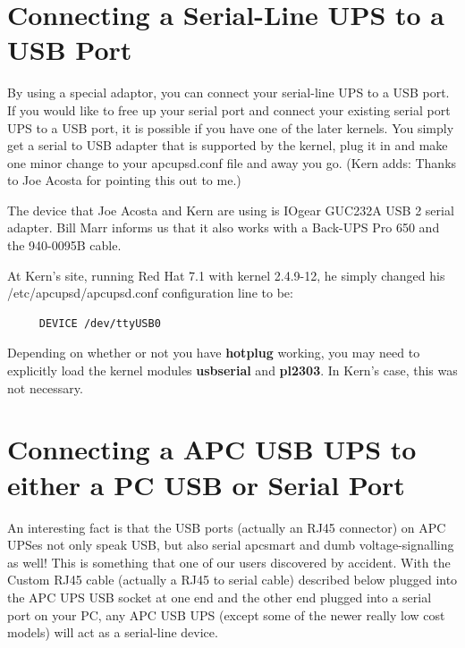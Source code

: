 {{{{{{{{{\label{Connecting-a-Serial_002dLine-UPS-to-a-USB-Port}

\section*{Connecting a Serial-Line UPS to a USB Port}

\label{index-Serial-on-USB-190}
By using a special adaptor, you can connect your serial-line UPS to a USB
port. If you would like to free up your serial port and connect your existing
serial port UPS to a USB port, it is possible if you have one of the later
kernels. You simply get a serial to USB adapter that is supported by the
kernel, plug it in and make one minor change to your apcupsd.conf file and
away you go. (Kern adds: Thanks to Joe Acosta for pointing this out to me.)  

The device that Joe Acosta and Kern are using is IOgear GUC232A USB 2 serial
adapter. Bill Marr informs us that it also works with a Back-UPS Pro 650 and
the 940-0095B cable.  

At Kern's site, running Red Hat 7.1 with kernel 2.4.9-12, he simply changed
his /etc/apcupsd/apcupsd.conf configuration line to be: 

\footnotesize
\begin{verbatim}
     DEVICE /dev/ttyUSB0
\end{verbatim}
\normalsize

Depending on whether or not you have {\bf hotplug} working, you may need to
explicitly load the kernel modules {\bf usbserial} and {\bf pl2303}. In Kern's
case, this was not necessary. 

\label{Connecting-a-APC-USB-UPS-to-either-a-PC-USB-or-Serial-Port}

\section*{Connecting a APC USB UPS to either a PC USB or Serial Port}

An interesting fact is that the USB ports (actually an RJ45 connector) on APC
UPSes not only speak USB, but also serial apcsmart and dumb voltage-signalling
as well! This is something that one of our users discovered by accident. With
the Custom RJ45 cable (actually a RJ45 to serial cable) described below
plugged into the APC UPS USB socket at one end and the other end plugged into
a serial port on your PC, any APC USB UPS (except some of the newer really low
cost models) will act as a serial-line device. 

}}}}}}}}}
